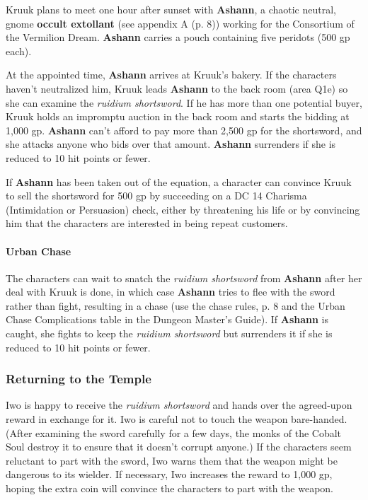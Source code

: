 \documentclass[a4paper, 11pt, bg=full, twocolumn, nooutline]{dndbook}
\begin{document}
Kruuk plans to meet one hour after sunset with \textbf{Ashann}, a chaotic neutral, gnome \textbf{occult extollant} (see appendix A (p. 8)) working for the Consortium of the Vermilion Dream. \textbf{Ashann} carries a pouch containing five peridots (500 gp each).


At the appointed time, \textbf{Ashann} arrives at Kruuk's bakery. If the characters haven't neutralized him, Kruuk leads \textbf{Ashann} to the back room (area Q1e) so she can examine the \textit{ruidium shortsword}. If he has more than one potential buyer, Kruuk holds an impromptu auction in the back room and starts the bidding at 1,000 gp. \textbf{Ashann} can't afford to pay more than 2,500 gp for the shortsword, and she attacks anyone who bids over that amount. \textbf{Ashann} surrenders if she is reduced to 10 hit points or fewer.

If \textbf{Ashann} has been taken out of the equation, a character can convince Kruuk to sell the shortsword for 500 gp by succeeding on a DC 14 Charisma (Intimidation or Persuasion) check, either by threatening his life or by convincing him that the characters are interested in being repeat customers.

\paragraph{Urban Chase}

The characters can wait to snatch the \textit{ruidium shortsword} from \textbf{Ashann} after her deal with Kruuk is done, in which case \textbf{Ashann} tries to flee with the sword rather than fight, resulting in a chase (use the chase rules, p. 8 and the Urban Chase Complications table in the Dungeon Master's Guide). If \textbf{Ashann} is caught, she fights to keep the \textit{ruidium shortsword} but surrenders it if she is reduced to 10 hit points or fewer.

\subsubsection{Returning to the Temple}

Iwo is happy to receive the \textit{ruidium shortsword} and hands over the agreed-upon reward in exchange for it. Iwo is careful not to touch the weapon bare-handed. (After examining the sword carefully for a few days, the monks of the Cobalt Soul destroy it to ensure that it doesn't corrupt anyone.) If the characters seem reluctant to part with the sword, Iwo warns them that the weapon might be dangerous to its wielder. If necessary, Iwo increases the reward to 1,000 gp, hoping the extra coin will convince the characters to part with the weapon.
\end{document}
